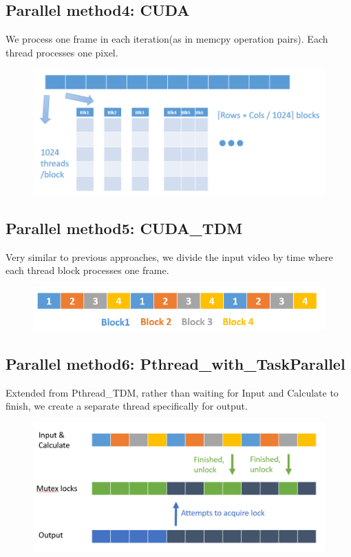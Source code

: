 \documentclass{acm_proc_article-sp}
\begin{document}
\subsection{Parallel method4: CUDA}
We process one frame in each iteration(as in memcpy operation pairs). Each thread processes one pixel.
\begin{figure}[H]
  \includegraphics[width=\linewidth,natwidth=874,natheight=376]{CUDA.png}
  \label{fig:CUDA}
\end{figure}
\subsection{Parallel method5: CUDA\_TDM}
Very similar to previous approaches, we divide the input video by time where each thread block processes one frame.
\begin{figure}[H]
  \includegraphics[width=\linewidth,natwidth=766,natheight=114]{CUDA_TDM.png}
  \label{fig:CUDA_TDM}
\end{figure}
\subsection{Parallel method6: Pthread\_with\_TaskParallel}
Extended from Pthread\_TDM, rather than waiting for Input and Calculate to finish, we create a separate thread specifically for output. 
\begin{figure}[H]
  \includegraphics[width=\linewidth,natwidth=954,natheight=420]{Pthread_with_TaskParallel.png}
  \label{fig:Pthread_with_TaskParallel}
\end{figure}
\end{document}
